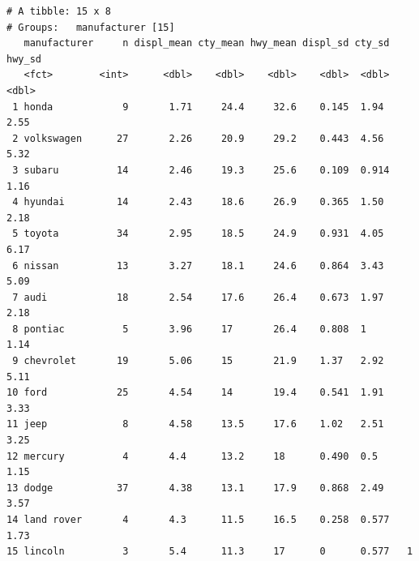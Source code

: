 \documentclass[
  11pt,
]{krantz}
\newenvironment{Shaded}{\begin{snugshade}}{\end{snugshade}}
\newcommand{\CommentTok}[1]{\textcolor[rgb]{0.37,0.37,0.37}{\textit{#1}}}
\newcommand{\DataTypeTok}[1]{\textcolor[rgb]{0.27,0.27,0.27}{#1}}
\newcommand{\DecValTok}[1]{\textcolor[rgb]{0.06,0.06,0.06}{#1}}
\newcommand{\KeywordTok}[1]{\textcolor[rgb]{0.27,0.27,0.27}{\textbf{#1}}}
\newcommand{\NormalTok}[1]{#1}
\newcommand{\OperatorTok}[1]{\textcolor[rgb]{0.43,0.43,0.43}{\textbf{#1}}}
\newcommand{\StringTok}[1]{\textcolor[rgb]{0.5,0.5,0.5}{#1}}
\begin{document}
\begin{Shaded}
\end{Shaded}

\begin{verbatim}
# A tibble: 15 x 8
# Groups:   manufacturer [15]
   manufacturer     n displ_mean cty_mean hwy_mean displ_sd cty_sd hwy_sd
   <fct>        <int>      <dbl>    <dbl>    <dbl>    <dbl>  <dbl>  <dbl>
 1 honda            9       1.71     24.4     32.6    0.145  1.94    2.55
 2 volkswagen      27       2.26     20.9     29.2    0.443  4.56    5.32
 3 subaru          14       2.46     19.3     25.6    0.109  0.914   1.16
 4 hyundai         14       2.43     18.6     26.9    0.365  1.50    2.18
 5 toyota          34       2.95     18.5     24.9    0.931  4.05    6.17
 6 nissan          13       3.27     18.1     24.6    0.864  3.43    5.09
 7 audi            18       2.54     17.6     26.4    0.673  1.97    2.18
 8 pontiac          5       3.96     17       26.4    0.808  1       1.14
 9 chevrolet       19       5.06     15       21.9    1.37   2.92    5.11
10 ford            25       4.54     14       19.4    0.541  1.91    3.33
11 jeep             8       4.58     13.5     17.6    1.02   2.51    3.25
12 mercury          4       4.4      13.2     18      0.490  0.5     1.15
13 dodge           37       4.38     13.1     17.9    0.868  2.49    3.57
14 land rover       4       4.3      11.5     16.5    0.258  0.577   1.73
15 lincoln          3       5.4      11.3     17      0      0.577   1   
\end{verbatim}
\end{document}
